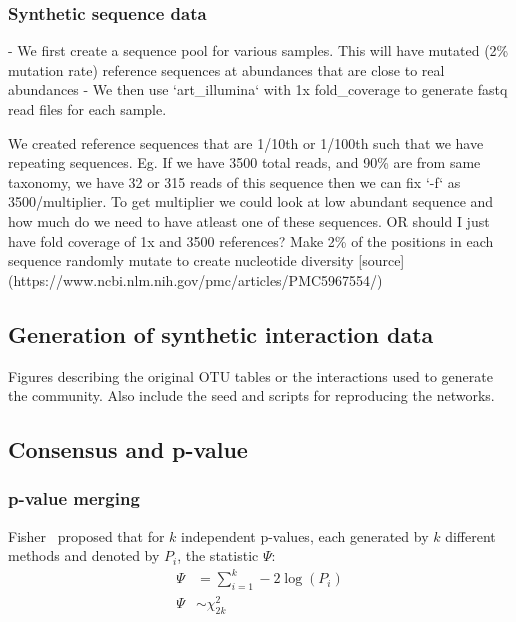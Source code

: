   \subsubsection{Synthetic sequence data}
  - We first create a sequence pool for various samples. This will have mutated (2\% mutation rate) reference sequences at abundances that are close to real abundances
  - We then use `art_illumina` with 1x fold_coverage to generate fastq read files for each sample.

    We created reference sequences that are 1/10th or 1/100th such that we have repeating sequences. Eg. If we have 3500 total reads, and 90\% are from same taxonomy, we have 32 or 315 reads of this sequence then we can fix `-f` as 3500/multiplier. To get multiplier we  could look at low abundant sequence and how much do we need to have atleast one of these sequences. OR should I just have fold coverage of 1x and 3500 references? Make 2\% of the positions in each sequence randomly mutate to create nucleotide diversity [source](https://www.ncbi.nlm.nih.gov/pmc/articles/PMC5967554/)

  \subsection{Generation of synthetic interaction data}
  Figures describing the original OTU tables or the interactions used to generate the community. Also include the seed and scripts for reproducing the networks.

  \subsection{Consensus and p-value}

  \subsubsection*{p-value merging}
  Fisher~\cite{fisher_224a_1948} proposed that for $k$ independent p-values, each generated by $k$ different methods and denoted by $P_i$, the statistic $\Psi$:
  \begin{equation*}
    \begin{aligned}
        \Psi &= \sum_{i=1}^k -2 \log \left( P_i \right) \\
        \Psi &\sim \chi^2_{2k}
    \end{aligned}
  \end{equation*}

